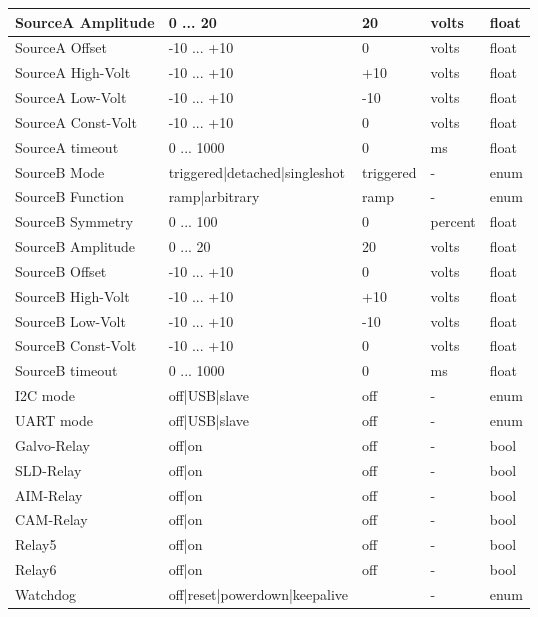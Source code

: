 \begin{table}[H]
\begin{tabular}{l|p{65mm}|l|l|l}
			SourceA Amplitude	& 	0 ... 20					& 20			& volts		& float	\\ \hline
			SourceA Offset		& -10 ... +10					& 0				& volts		& float	\\ \hline
			SourceA High-Volt	& -10 ... +10					& +10			& volts		& float	\\ \hline
			SourceA Low-Volt	& -10 ... +10					& -10			& volts		& float	\\ \hline
			SourceA Const-Volt	& -10 ... +10					& 0				& volts		& float	\\ \hline
			SourceA timeout		& 0 ... 1000					& 0				& ms		& float	\\ \hline
			SourceB Mode		& triggered|detached|singleshot	& triggered		& -			& enum	\\ \hline	
			SourceB Function	& ramp|arbitrary				& ramp			& -			& enum	\\ \hline	
			SourceB Symmetry	& 0	... 100						& 0				& percent	& float	\\ \hline
			SourceB Amplitude	& 0	...  20						& 20			& volts		& float	\\ \hline
			SourceB Offset		& -10 ... +10					& 0				& volts		& float	\\ \hline
			SourceB High-Volt	& -10 ... +10					& +10			& volts		& float	\\ \hline
			SourceB Low-Volt	& -10 ... +10					& -10			& volts		& float	\\ \hline
			SourceB Const-Volt	& -10 ... +10					& 0				& volts		& float	\\ \hline
			SourceB timeout		& 0 ... 1000					& 0				& ms		& float	\\ \hline
			I2C mode    	   	& off|USB|slave 				& off			& -			& enum	\\ \hline
			UART mode	     	& off|USB|slave 				& off			& -			& enum	\\ \hline
			Galvo-Relay			& off|on						& off			& -			& bool	\\ \hline
			SLD-Relay			& off|on						& off			& -			& bool	\\ \hline
			AIM-Relay			& off|on						& off			& -			& bool	\\ \hline
			CAM-Relay			& off|on						& off			& -			& bool	\\ \hline
			Relay5				& off|on						& off			& -			& bool	\\ \hline
			Relay6				& off|on						& off			& -			& bool	\\ \hline
			Watchdog			& off|reset|powerdown|keepalive &				& -			& enum	\\ \hline

\end{tabular}
\end{table}
